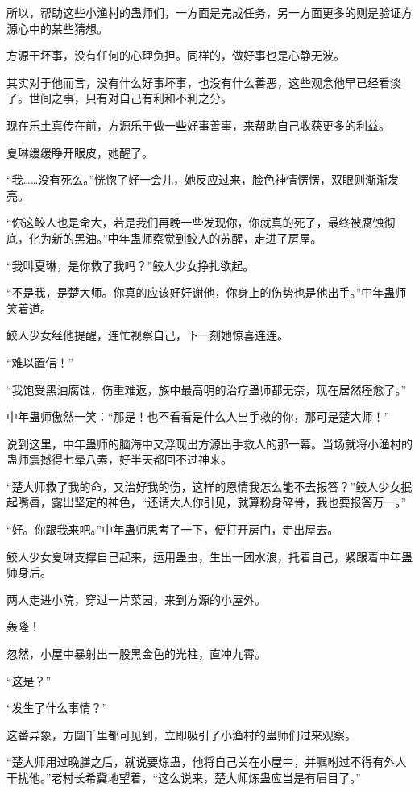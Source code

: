 \begin{this_body}
所以，帮助这些小渔村的蛊师们，一方面是完成任务，另一方面更多的则是验证方源心中的某些猜想。

方源干坏事，没有任何的心理负担。同样的，做好事也是心静无波。

其实对于他而言，没有什么好事坏事，也没有什么善恶，这些观念他早已经看淡了。世间之事，只有对自己有利和不利之分。

现在乐土真传在前，方源乐于做一些好事善事，来帮助自己收获更多的利益。

夏琳缓缓睁开眼皮，她醒了。

“我……没有死么。”恍惚了好一会儿，她反应过来，脸色神情愣愣，双眼则渐渐发亮。

“你这鲛人也是命大，若是我们再晚一些发现你，你就真的死了，最终被腐蚀彻底，化为新的黑油。”中年蛊师察觉到鲛人的苏醒，走进了房屋。

“我叫夏琳，是你救了我吗？”鲛人少女挣扎欲起。

“不是我，是楚大师。你真的应该好好谢他，你身上的伤势也是他出手。”中年蛊师笑着道。

鲛人少女经他提醒，连忙视察自己，下一刻她惊喜连连。

“难以置信！”

“我饱受黑油腐蚀，伤重难返，族中最高明的治疗蛊师都无奈，现在居然痊愈了。”

中年蛊师傲然一笑：“那是！也不看看是什么人出手救的你，那可是楚大师！”

说到这里，中年蛊师的脑海中又浮现出方源出手救人的那一幕。当场就将小渔村的蛊师震撼得七晕八素，好半天都回不过神来。

“楚大师救了我的命，又治好我的伤，这样的恩情我怎么能不去报答？”鲛人少女抿起嘴唇，露出坚定的神色，“还请大人你引见，就算粉身碎骨，我也要报答万一。”

“好。你跟我来吧。”中年蛊师思考了一下，便打开房门，走出屋去。

鲛人少女夏琳支撑自己起来，运用蛊虫，生出一团水浪，托着自己，紧跟着中年蛊师身后。

两人走进小院，穿过一片菜园，来到方源的小屋外。

轰隆！

忽然，小屋中暴射出一股黑金色的光柱，直冲九霄。

“这是？”

“发生了什么事情？”

这番异象，方圆千里都可见到，立即吸引了小渔村的蛊师们过来观察。

“楚大师用过晚膳之后，就说要炼蛊，他将自己关在小屋中，并嘱咐过不得有外人干扰他。”老村长希冀地望着，“这么说来，楚大师炼蛊应当是有眉目了。”


\end{this_body}

